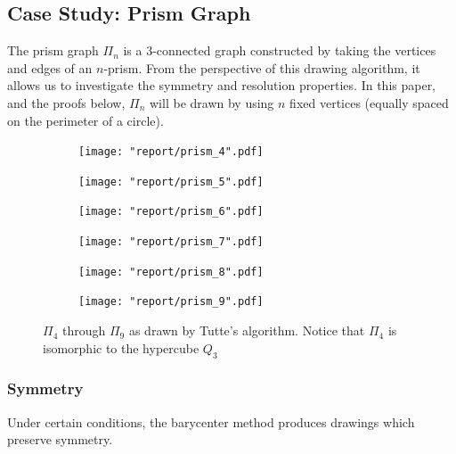 \documentclass[11pt]{report}
\begin{document}
\subsection{Case Study: Prism Graph}
The prism graph $\Pi_{n}$ is a 3-connected graph constructed by taking the vertices and edges of an $n$-prism. From the perspective of this drawing algorithm, it allows us to investigate the symmetry and resolution properties. In this paper, and the proofs below, $\Pi_{n}$ will be drawn by using $n$ fixed vertices (equally spaced on the perimeter of a circle).

\begin{figure}[H]
    \begin{subfigure}{.3\textwidth}
        \texttt{[image: "report/prism\_4".pdf]}
    \end{subfigure}
    \begin{subfigure}{.3\textwidth}
        \texttt{[image: "report/prism\_5".pdf]}
    \end{subfigure}
    \begin{subfigure}{.3\textwidth}
        \texttt{[image: "report/prism\_6".pdf]}
    \end{subfigure}
    \begin{subfigure}{.3\textwidth}
        \texttt{[image: "report/prism\_7".pdf]}
    \end{subfigure}
    \begin{subfigure}{.3\textwidth}
        \texttt{[image: "report/prism\_8".pdf]}
    \end{subfigure}
    \begin{subfigure}{.3\textwidth}
        \texttt{[image: "report/prism\_9".pdf]}
    \end{subfigure}
    \caption{$\Pi_4$ through $\Pi_{9}$ as drawn by Tutte's algorithm. Notice that $\Pi_4$ is isomorphic to the hypercube $Q_3$}
\end{figure}

\subsubsection{Symmetry}
Under certain conditions, the barycenter method produces drawings which preserve symmetry.
\end{document}
